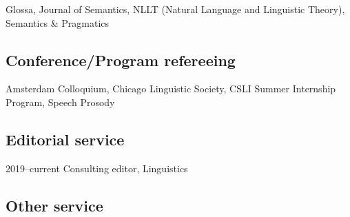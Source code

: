 \documentclass[letterpaper]{article}
\renewenvironment{itemize}{
  \begin{list}{}{
    \setlength{\leftmargin}{1.5em}
  }
}{
  \end{list}
}
\begin{document}
\begin{itemize}\itemsep -1pt
\item Glossa, Journal of Semantics, NLLT (Natural Language and Linguistic Theory), \\ Semantics \& Pragmatics 
\end{itemize}

\subsection*{Conference/Program refereeing}

\begin{itemize}\itemsep -1pt
\item Amsterdam Colloquium, Chicago Linguistic Society, CSLI Summer Internship Program, Speech Prosody
\end{itemize}

\subsection*{Editorial service}

\begin{itemize}\itemsep -1pt
\item 2019--current Consulting editor, Linguistics
\end{itemize}

\subsection*{Other service}
\end{document}
